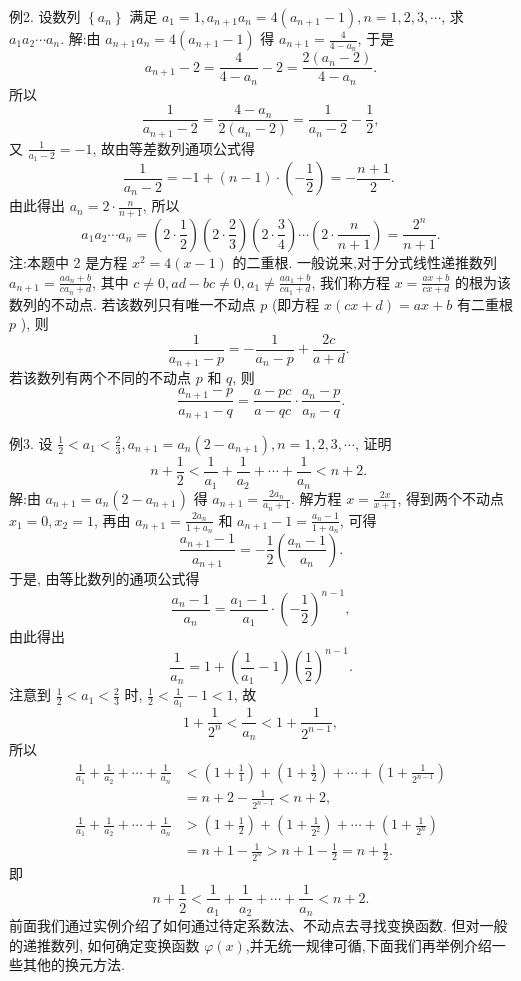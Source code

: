 例2. 设数列 $\left\{a_n\right\}$ 满足 $a_1=1, a_{n+1} a_n=4\left(a_{n+1}-1\right), n=1,2,3, \cdots$, 求
$a_1 a_2 \cdots a_n$.
解:由 $a_{n+1} a_n=4\left(a_{n+1}-1\right)$ 得 $a_{n+1}=\frac{4}{4-a_n}$, 于是
$$
a_{n+1}-2=\frac{4}{4-a_n}-2=\frac{2\left(a_n-2\right)}{4-a_n} .
$$
所以
$$
\frac{1}{a_{n+1}-2}=\frac{4-a_n}{2\left(a_n-2\right)}=\frac{1}{a_n-2}-\frac{1}{2},
$$
又 $\frac{1}{a_1-2}=-1$, 故由等差数列通项公式得
$$
\frac{1}{a_n-2}=-1+(n-1) \cdot\left(-\frac{1}{2}\right)=-\frac{n+1}{2} \text {. }
$$
由此得出 $a_n=2 \cdot \frac{n}{n+1}$, 所以
$$
a_1 a_2 \cdots a_n=\left(2 \cdot \frac{1}{2}\right)\left(2 \cdot \frac{2}{3}\right)\left(2 \cdot \frac{3}{4}\right) \cdots\left(2 \cdot \frac{n}{n+1}\right)=\frac{2^n}{n+1} .
$$
注:本题中 2 是方程 $x^2=4(x-1)$ 的二重根.
一般说来,对于分式线性递推数列 $a_{n+1}=\frac{a a_n+b}{c a_n+d}$, 其中 $c \neq 0, a d-b c \neq 0, a_1 \neq \frac{a a_1+b}{c a_1+d}$, 我们称方程 $x=\frac{a x+b}{c x+d}$ 的根为该数列的不动点.
若该数列只有唯一不动点 $p$ (即方程 $x(c x+d)=a x+b$ 有二重根 $p$ ), 则
$$
\frac{1}{a_{n+1}-p}=-\frac{1}{a_n-p}+\frac{2 c}{a+d} \text {. }
$$
若该数列有两个不同的不动点 $p$ 和 $q$, 则
$$
\frac{a_{n+1}-p}{a_{n+1}-q}=\frac{a-p c}{a-q c} \cdot \frac{a_n-p}{a_n-q} .
$$



例3. 设 $\frac{1}{2}<a_1<\frac{2}{3}, a_{n+1}=a_n\left(2-a_{n+1}\right), n=1,2,3, \cdots$, 证明
$$
n+\frac{1}{2}<\frac{1}{a_1}+\frac{1}{a_2}+\cdots+\frac{1}{a_n}<n+2 \text {. }
$$
解:由 $a_{n+1}=a_n\left(2-a_{n+1}\right)$ 得 $a_{n+1}=\frac{2 a_n}{a_n+1}$. 解方程 $x=\frac{2 x}{x+1}$, 得到两个不动点 $x_1=0, x_2=1$, 再由 $a_{n+1}=\frac{2 a_n}{1+a_n}$ 和 $a_{n+1}-1=\frac{a_n-1}{1+a_n}$, 可得
$$
\frac{a_{n+1}-1}{a_{n+1}}=-\frac{1}{2}\left(\frac{a_n-1}{a_n}\right) .
$$
于是, 由等比数列的通项公式得
$$
\frac{a_n-1}{a_n}=\frac{a_1-1}{a_1} \cdot\left(-\frac{1}{2}\right)^{n-1},
$$
由此得出
$$
\frac{1}{a_n}=1+\left(\frac{1}{a_1}-1\right)\left(\frac{1}{2}\right)^{n-1} .
$$
注意到 $\frac{1}{2}<a_1<\frac{2}{3}$ 时, $\frac{1}{2}<\frac{1}{a_1}-1<1$, 故
$$
1+\frac{1}{2^n}<\frac{1}{a_n}<1+\frac{1}{2^{n-1}},
$$
所以
$$
\begin{aligned}
\frac{1}{a_1}+\frac{1}{a_2}+\cdots+\frac{1}{a_n} & <\left(1+\frac{1}{1}\right)+\left(1+\frac{1}{2}\right)+\cdots+\left(1+\frac{1}{2^{n-1}}\right) \\
& =n+2-\frac{1}{2^{n-1}}<n+2, \\
\frac{1}{a_1}+\frac{1}{a_2}+\cdots+\frac{1}{a_n} & >\left(1+\frac{1}{2}\right)+\left(1+\frac{1}{2^2}\right)+\cdots+\left(1+\frac{1}{2^n}\right) \\
& =n+1-\frac{1}{2^n}>n+1-\frac{1}{2}=n+\frac{1}{2} .
\end{aligned}
$$
即
$$
n+\frac{1}{2}<\frac{1}{a_1}+\frac{1}{a_2}+\cdots+\frac{1}{a_n}<n+2 .
$$
前面我们通过实例介绍了如何通过待定系数法、不动点去寻找变换函数.
但对一般的递推数列, 如何确定变换函数 $\varphi(x)$,并无统一规律可循,下面我们再举例介绍一些其他的换元方法.



